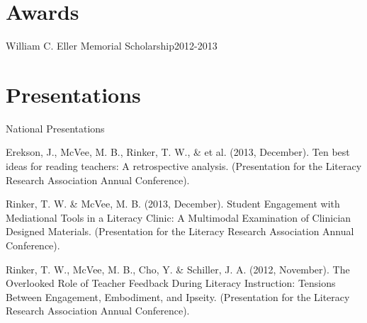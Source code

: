 \section{Awards}
\begin{innerlist}
    \item William C. Eller Memorial Scholarship\hfill 2012-2013
\end{innerlist}

\halfblankline

\section{Presentations}
National Presentations
\begin{innerlist}

\item Erekson, J., McVee, M. B., Rinker, T. W., \& et al. (2013, December). Ten best ideas for reading teachers: A retrospective analysis. (Presentation for the Literacy Research Association Annual Conference).

\item Rinker, T. W. \& McVee, M. B. (2013, December).  Student Engagement with Mediational Tools in a Literacy Clinic: A Multimodal Examination of Clinician Designed Materials.  (Presentation for the Literacy Research Association Annual Conference).

\item Rinker, T. W., McVee, M. B., Cho, Y. \& Schiller, J. A. (2012, November).  The Overlooked Role of Teacher Feedback During Literacy Instruction: Tensions Between Engagement, Embodiment, and Ipseity.  (Presentation for the Literacy Research Association Annual Conference).

\end{innerlist}




\halfblankline

